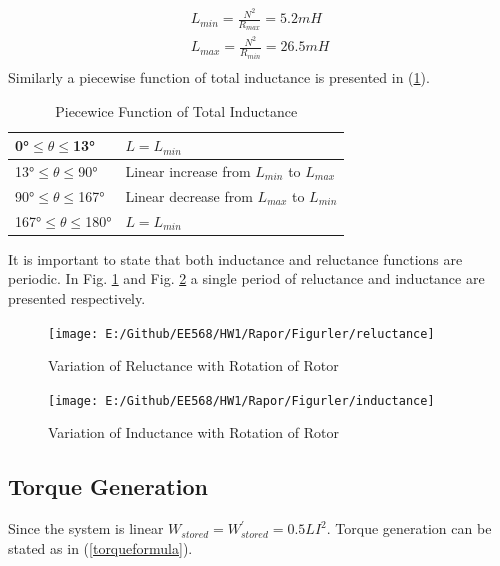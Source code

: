 \documentclass{article}
\begin{document}
\begin{equation}
\begin{array}{l}
L_{min}=\frac{N^2}{R_{max}}=5.2 mH\\  

L_{max}=\frac{N^2}{R_{min}}=26.5 mH\\  
\end{array}
\label{inductancecalculation}
\end{equation}
Similarly a piecewise function of total inductance is presented in (\ref{inductancetable}).
	\begin{table}[h!]
	\centering
	\caption{Piecewice Function of Total Inductance}
	\label{inductancetable}
	\begin{tabular}{ll}

		\hline
		\ang{0}$\leq$$\theta$$\leq$\ang{13}	& $L=L_{min}$ \\ \hline
		\ang{13}$\leq$$\theta$$\leq$\ang{90}	& Linear increase from $L_{min}$ to $L_{max}$ \\ \hline
		\ang{90}$\leq$$\theta$$\leq$\ang{167}	& Linear decrease from $L_{max}$ to $L_{min}$ \\ \hline
		\ang{167}$\leq$$\theta$$\leq$\ang{180}	& $L=L_{min}$ \\ \hline
	\end{tabular}	
\end{table}
It is important to state that both inductance and reluctance functions are periodic. In Fig. \ref{fig:reluctanceanalitic} and Fig. \ref{fig:inductanceanalitic} a single period of reluctance and inductance are presented respectively.
\begin{figure}[H]
	\centering
	\texttt{[image: E:/Github/EE568/HW1/Rapor/Figurler/reluctance]}
	\caption{Variation of Reluctance with Rotation of Rotor}
	\label{fig:reluctanceanalitic}
\end{figure}
\begin{figure}[H]
	\centering
	\texttt{[image: E:/Github/EE568/HW1/Rapor/Figurler/inductance]}
	\caption{Variation of Inductance with Rotation of Rotor}
	\label{fig:inductanceanalitic}
\end{figure}

\subsection{Torque Generation}
Since the system is linear $W_{stored}=W^{'}_{stored}=0.5LI^2$. Torque generation can be stated as in (\ref{torqueformula}).
\end{document}
